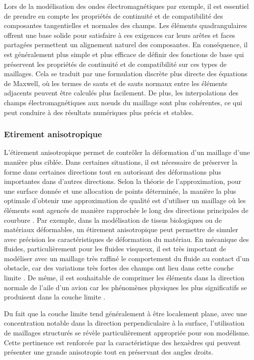  Lors de la modélisation des ondes électromagnétiques par exemple, il est essentiel de prendre en compte les propriétés de continuité et de compatibilité des composantes tangentielles et normales des champs. Les éléments quadrangulaires offrent une base solide pour satisfaire à ces exigences car leurs arêtes et faces partagées permettent un alignement naturel des composantes. En conséquence, il est généralement plus simple et plus efficace de définir des fonctions de base qui préservent les propriétés de continuité et de compatibilité sur ces types de maillages. Cela se traduit par une formulation discrète plus directe des équations de Maxwell, où les termes de sauts et de sauts normaux entre les éléments adjacents peuvent être calculés plus facilement. De plus, les interpolations des champs électromagnétiques aux nœuds du maillage sont plus cohérentes, ce qui peut conduire à des résultats numériques plus précis et stables.

\subsubsection{Etirement anisotropique}

L'étirement anisotropique permet de contrôler la déformation d'un maillage d'une manière plus ciblée. Dans certaines situations, il est nécessaire de préserver la forme dans certaines directions tout en autorisant des déformations plus importantes dans d'autres directions. Selon la théorie de l'approximation, pour une surface donnée et une allocation de points déterminée, la manière la plus optimale d'obtenir une approximation de qualité est d'utiliser un maillage où les éléments sont agencés de manière rapprochée le long des directions principales de courbure \cite{d2000bilinear}. Par exemple, dans la modélisation de tissus biologiques ou de matériaux déformables, un étirement anisotropique peut permettre de simuler avec précision les caractéristiques de déformation du matériau. En mécanique des fluides, particulièrement pour les fluides visqueux, il est très important de modéliser avec un maillage très raffiné le comportement du fluide au contact d’un obstacle, car des variations très fortes des champs ont lieu dans cette couche limite \cite{reberol2018maillages}. De même, il est souhaitable de comprimer les éléments dans la direction normale de l'aile d'un avion car les phénomènes physiques les plus significatifs se produisent dans la couche limite \cite{bommes2013quad}.

Du fait que la couche limite tend généralement à être localement plane, avec une concentration notable dans la direction perpendiculaire à la surface, l'utilisation de maillages structurés se révèle particulièrement appropriée pour son modélisme. Cette pertinence est renforcée par la caractéristique des hexaèdres qui peuvent présenter une grande anisotropie tout en préservant des angles droits. 


